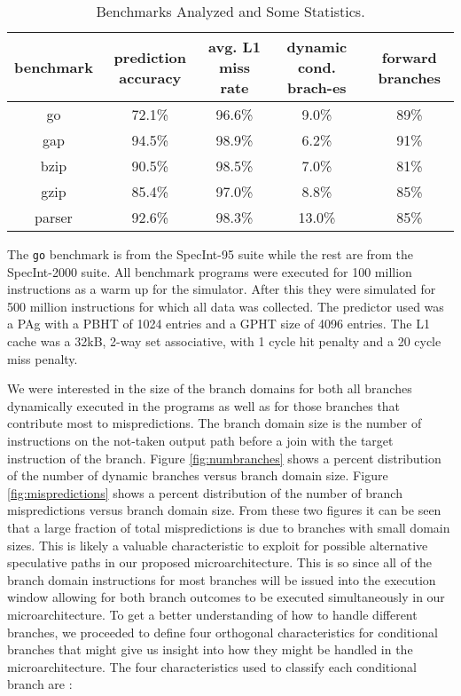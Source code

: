\documentclass[10pt,dvips]{article}
\begin{document}
\begin{table}
\begin{center}
\caption{Benchmarks Analyzed and Some Statistics.}\label{tab:benches}
\begin{tabular}{|c|c|c|c|c|}
\hline 
benchmark&
prediction accuracy&
avg. L1 miss rate&
dynamic cond. brach-es & forward branches\\
\hline
\hline 
go&
72.1\%&
96.6\%&
9.0\% & 89\%\\
\hline 
gap&
94.5\%&
98.9\%&
6.2\% & 91\%\\
\hline 
bzip&
90.5\%&
98.5\%&
7.0\%&81\%\\
\hline 
gzip&
85.4\%&
97.0\%&
8.8\%&85\%\\
\hline 
parser&
92.6\%&
98.3\%&
13.0\%&85\%\\
\hline
\end{tabular}
\end{center}
\end{table}

The {\tt go} benchmark is from the SpecInt-95 suite while the rest
are from the SpecInt-2000 suite.
All benchmark programs were executed for 100 million instructions
as a warm up for the simulator.  After this they were simulated
for 500 million instructions for which all data was collected.
The predictor used was a PAg with
a PBHT of 1024 entries and a GPHT size of 4096 entries.
The L1 cache was a 32kB, 2-way set associative, with 1 cycle hit
penalty and a 20 cycle miss penalty.

We were interested
in the size of the branch domains for both all branches
dynamically executed in the programs as well as for those branches 
that contribute most to mispredictions.  The branch domain size
is the number of instructions on the not-taken output path
before a join with the target instruction of the branch.
Figure \ref{fig:numbranches} shows a percent distribution of
the number of dynamic branches versus 
branch domain size.  
Figure \ref{fig:mispredictions} shows a percent distribution of
the number of branch mispredictions versus
branch domain size.
From these two figures it can be seen 
that a large fraction of total mispredictions 
is due to branches with small domain
sizes. 
This is likely a valuable characteristic to exploit for
possible alternative speculative paths in our proposed
microarchitecture.  This is so since all of the branch domain
instructions for most
branches will be issued into the execution window allowing
for both branch outcomes to be executed simultaneously
in our microarchitecture.
To get a better understanding of how to handle different branches,
we proceeded to define four orthogonal characteristics
for conditional branches that might give us insight into
how they might be handled in the microarchitecture.
The four characteristics used to classify each conditional branch are :
\end{document}

